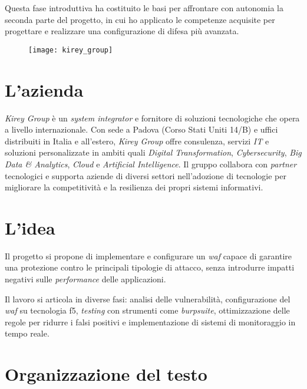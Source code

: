 Questa fase introduttiva ha costituito le basi per affrontare con autonomia la seconda parte del progetto, in cui ho applicato le competenze acquisite per progettare e realizzare una configurazione di difesa più avanzata.

\newpage
\begin{figure}[htbp]
    \centering
    \texttt{[image: kirey\_group]}
\end{figure}
\vspace{-20pt}

\section{L'azienda}

\emph{Kirey Group} è un \emph{system integrator} e fornitore di soluzioni tecnologiche che opera a livello internazionale. Con sede a Padova (Corso Stati Uniti 14/B) e uffici distribuiti in Italia e all'estero, \emph{Kirey Group} offre consulenza, servizi \emph{IT} e soluzioni personalizzate in ambiti quali \emph{Digital Transformation}, \emph{Cybersecurity}, \emph{Big Data \& Analytics}, \emph{Cloud} e \emph{Artificial Intelligence}. Il gruppo collabora con \emph{partner} tecnologici e supporta aziende di diversi settori nell'adozione di tecnologie per migliorare la competitività e la resilienza dei propri sistemi informativi.

\section{L'idea}

Il progetto si propone di implementare e configurare un \emph{\gls{waf}} capace di garantire una protezione contro le principali tipologie di attacco, senza introdurre impatti negativi sulle \emph{performance} delle applicazioni.

Il lavoro si articola in diverse fasi: analisi delle vulnerabilità, configurazione del \emph{\gls{waf}} su tecnologia \gls{f5}, \emph{testing} con strumenti come \emph{\gls{burpsuite}}, ottimizzazione delle regole per ridurre i falsi positivi e implementazione di sistemi di monitoraggio in tempo reale.

\section{Organizzazione del testo}

